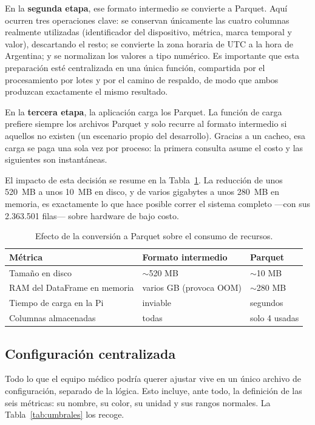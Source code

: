 \documentclass[12pt,a4paper]{article}
\begin{document}
    En la \textbf{segunda etapa}, ese formato intermedio se convierte a Parquet. Aquí ocurren tres operaciones clave: se conservan únicamente las cuatro columnas realmente utilizadas (identificador del dispositivo, métrica, marca temporal y valor), descartando el resto; se convierte la zona horaria de UTC a la hora de Argentina; y se normalizan los valores a tipo numérico. Es importante que esta preparación esté centralizada en una única función, compartida por el procesamiento por lotes y por el camino de respaldo, de modo que ambos produzcan exactamente el mismo resultado.

    En la \textbf{tercera etapa}, la aplicación carga los Parquet. La función de carga prefiere siempre los archivos Parquet y solo recurre al formato intermedio si aquellos no existen (un escenario propio del desarrollo). Gracias a un cacheo, esa carga se paga una sola vez por proceso: la primera consulta asume el costo y las siguientes son instantáneas.

    El impacto de esta decisión se resume en la Tabla~\ref{tab:parquet}. La reducción de unos 520~MB a unos 10~MB en disco, y de varios gigabytes a unos 280~MB en memoria, es exactamente lo que hace posible correr el sistema completo —con sus 2.363.501 filas— sobre hardware de bajo costo.

    \begin{table}[h]
        \centering
        \begin{tabular}{l l l}
            \hline
            \textbf{Métrica} & \textbf{Formato intermedio} & \textbf{Parquet} \\
            \hline
            Tamaño en disco & $\sim$520 MB & $\sim$10 MB \\
            RAM del DataFrame en memoria & varios GB (provoca OOM) & $\sim$280 MB \\
            Tiempo de carga en la Pi & inviable & segundos \\
            Columnas almacenadas & todas & solo 4 usadas \\
            \hline
        \end{tabular}
        \caption{Efecto de la conversión a Parquet sobre el consumo de recursos.}
        \label{tab:parquet}
    \end{table}

    \subsection{Configuración centralizada}
    Todo lo que el equipo médico podría querer ajustar vive en un único archivo de configuración, separado de la lógica. Esto incluye, ante todo, la definición de las seis métricas: su nombre, su color, su unidad y sus rangos normales. La Tabla~\ref{tab:umbrales} los recoge.
\end{document}
